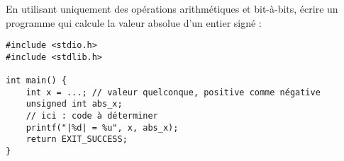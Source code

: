 \documentclass[../../../main.tex]{subfiles}
\begin{document}
En utilisant uniquement des opérations arithmétiques et bit-à-bits, écrire un programme qui calcule la valeur absolue d'un entier signé :
\begin{verbatim}
#include <stdio.h>
#include <stdlib.h>

int main() {
	int x = ...; // valeur quelconque, positive comme négative
	unsigned int abs_x;
	// ici : code à déterminer
	printf("|%d| = %u", x, abs_x);
	return EXIT_SUCCESS;
}
\end{verbatim}
\end{document}
